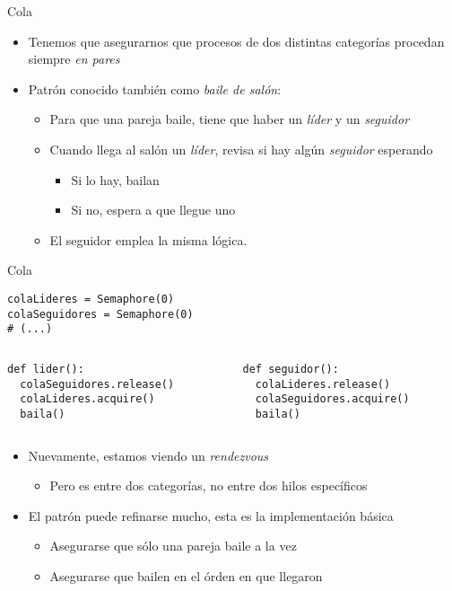 \documentclass[presentation]{beamer}
\begin{document}
\begin{frame}[label={sec:orge707a18}]{Cola}
\begin{itemize}
\item Tenemos que asegurarnos que procesos de dos distintas categorías
procedan siempre \emph{en pares}
\item Patrón conocido también como \emph{baile de salón}:
\begin{itemize}
\item Para que una pareja baile, tiene que haber un \emph{líder} y un
\emph{seguidor}
\item Cuando llega al salón un \emph{líder}, revisa si hay algún \emph{seguidor}
esperando
\begin{itemize}
\item Si lo hay, bailan
\item Si no, espera a que llegue uno
\end{itemize}
\item El seguidor emplea la misma lógica.
\end{itemize}
\end{itemize}
\end{frame}

\begin{frame}[label={sec:orgff98e54},fragile]{Cola}
 \begin{verbatim}
colaLideres = Semaphore(0)
colaSeguidores = Semaphore(0)
# (...)
\end{verbatim}
\begin{columns}\begin{column}{0.5\textwidth}
\begin{verbatim}
def lider():
  colaSeguidores.release()
  colaLideres.acquire()
  baila()
\end{verbatim}
\end{column} \begin{column}{0.5\textwidth}
\begin{verbatim}
def seguidor():
  colaLideres.release()
  colaSeguidores.acquire()
  baila()
\end{verbatim}
\end{column}\end{columns}
\pause
\begin{itemize}
\item Nuevamente, estamos viendo un \emph{rendezvous}
\begin{itemize}
\item Pero es entre dos categorías, no entre dos hilos específicos
\end{itemize}
\item El patrón puede refinarse mucho, esta es la implementación básica
\begin{itemize}
\item Asegurarse que sólo una pareja baile a la vez
\item Asegurarse que bailen en el órden en que llegaron
\end{itemize}
\end{itemize}
\end{frame}
\end{document}

